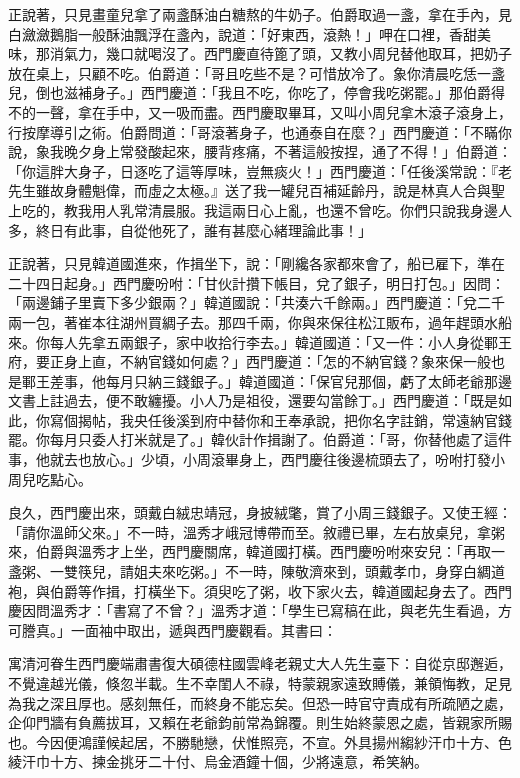 正說著，只見畫童兒拿了兩盞酥油白糖熬的牛奶子。伯爵取過一盞，拿在手內，見白瀲瀲鵝脂一般酥油飄浮在盞內，說道：「好東西，滾熱！」呷在口裡，香甜美味，那消氣力，幾口就喝沒了。西門慶直待篦了頭，又教小周兒替他取耳，把奶子放在桌上，只顧不吃。伯爵道：「哥且吃些不是？可惜放冷了。象你清晨吃恁一盞兒，倒也滋補身子。」西門慶道：「我且不吃，你吃了，停會我吃粥罷。」那伯爵得不的一聲，拿在手中，又一吸而盡。西門慶取畢耳，又叫小周兒拿木滾子滾身上，行按摩導引之術。伯爵問道：「哥滾著身子，也通泰自在麼？」西門慶道：「不瞞你說，象我晚夕身上常發酸起來，腰背疼痛，不著這般按捏，通了不得！」伯爵道：「你這胖大身子，日逐吃了這等厚味，豈無痰火！」西門慶道：「任後溪常說：『老先生雖故身體魁偉，而虛之太極。』送了我一罐兒百補延齡丹，說是林真人合與聖上吃的，教我用人乳常清晨服。我這兩日心上亂，也還不曾吃。你們只說我身邊人多，終日有此事，自從他死了，誰有甚麼心緒理論此事！」

正說著，只見韓道國進來，作揖坐下，說：「剛纔各家都來會了，船已雇下，準在二十四日起身。」西門慶吩咐：「甘伙計攢下帳目，兌了銀子，明日打包。」因問：「兩邊鋪子里賣下多少銀兩？」韓道國說：「共湊六千餘兩。」西門慶道：「兌二千兩一包，著崔本往湖州買綢子去。那四千兩，你與來保往松江販布，過年趕頭水船來。你每人先拿五兩銀子，家中收拾行李去。」韓道國道：「又一件：小人身從鄆王府，要正身上直，不納官錢如何處？」西門慶道：「怎的不納官錢？象來保一般也是鄆王差事，他每月只納三錢銀子。」韓道國道：「保官兒那個，虧了太師老爺那邊文書上註過去，便不敢纏擾。小人乃是祖役，還要勾當餘丁。」西門慶道：「既是如此，你寫個揭帖，我央任後溪到府中替你和王奉承說，把你名字註銷，常遠納官錢罷。你每月只委人打米就是了。」韓伙計作揖謝了。伯爵道：「哥，你替他處了這件事，他就去也放心。」少頃，小周滾畢身上，西門慶往後邊梳頭去了，吩咐打發小周兒吃點心。

良久，西門慶出來，頭戴白絨忠靖冠，身披絨氅，賞了小周三錢銀子。又使王經：「請你溫師父來。」不一時，溫秀才峨冠博帶而至。敘禮已畢，左右放桌兒，拿粥來，伯爵與溫秀才上坐，西門慶關席，韓道國打橫。西門慶吩咐來安兒：「再取一盞粥、一雙筷兒，請姐夫來吃粥。」不一時，陳敬濟來到，頭戴孝巾，身穿白綢道袍，與伯爵等作揖，打橫坐下。須臾吃了粥，收下家火去，韓道國起身去了。西門慶因問溫秀才：「書寫了不曾？」溫秀才道：「學生已寫稿在此，與老先生看過，方可謄真。」一面袖中取出，遞與西門慶觀看。其書曰：

寓清河眷生西門慶端肅書復大碩德柱國雲峰老親丈大人先生臺下：自從京邸邂逅，不覺違越光儀，倏忽半載。生不幸閨人不祿，特蒙親家遠致賻儀，兼領悔教，足見為我之深且厚也。感刻無任，而終身不能忘矣。但恐一時官守責成有所疏陋之處，企仰門牆有負薦拔耳，又賴在老爺鈞前常為錦覆。則生始終蒙恩之處，皆親家所賜也。今因便鴻謹候起居，不勝馳戀，伏惟照亮，不宣。外具揚州縐紗汗巾十方、色綾汗巾十方、揀金挑牙二十付、烏金酒鐘十個，少將遠意，希笑納。

